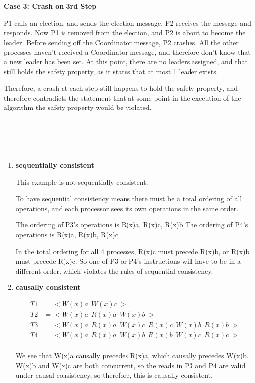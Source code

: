 \documentclass[12pt,a4paper]{article}
\begin{document}
\begin{enumerate}[label=(\alph*)]
\textbf{Case 3: Crash on 3rd Step}

P1 calls an election, and sends the election message. P2 receives the message and responds. Now P1 is removed from the election, and P2 is about to become the leader. Before sending off the Coordinator message, P2 crashes. All the other processes haven't received a Coordinator message, and therefore don't know that a new leader has been set. At this point, there are no leaders assigned, and that still holds the safety property, as it states that at most 1 leader exists.

Therefore, a crash at each step still happens to hold the safety property, and therefore contradicts the statement that at some point in the execution of the algorithm the safety property would be violated.


\end{enumerate}


\clearpage

\section{~}

\begin{enumerate}[label=(\alph*)]

\item \textbf{sequentially consistent}

This example is not sequentially consistent.

To have sequential consistency means there must be a total ordering of all operations, and each processor sees its own operations in the same order.

The ordering of P3's operations is R(x)a, R(x)c, R(x)b
The ordering of P4's operations is R(x)a, R(x)b, R(x)c

In the total ordering for all 4 processes, R(x)c must precede R(x)b, or R(x)b must precede R(x)c. So one of P3 or P4's instructions will have to be in a different order, which violates the rules of sequential consistency.


\item \textbf{causally consistent}

\begin{align*}
T1 &= <W(x)a\ \ W(x)c\ >\\
T2 &= <W(x)a\ \ R(x)a\ \ W(x)b\ >\\
T3 &= <W(x)a\ \ R(x)a\ \ W(x)c\ \ R(x)c\ \ W(x)b\ \ R(x)b\ >\\
T4 &= <W(x)a\ \ R(x)a\ \ W(x)b\ \ R(x)b\ \ W(x)c\ \ R(x)c\ >\\
\end{align*}

We see that W(x)a causally precedes R(x)a, which causally precedes W(x)b. W(x)b and W(x)c are both concurrent, so the reads in P3 and P4 are valid under causal consistency, so therefore, this is causally consistent.

\end{enumerate}
\end{document}

